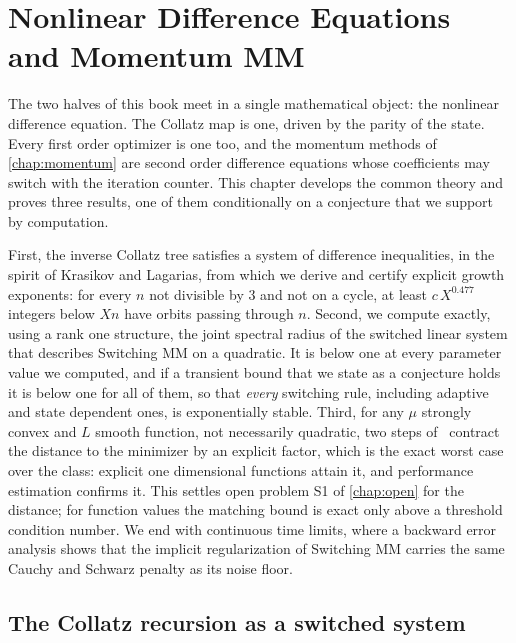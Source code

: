 \chapter{Nonlinear Difference Equations and Momentum MM}\label{chap:difference}

The two halves of this book meet in a single mathematical object: the
nonlinear difference equation. The Collatz map is one, driven by the parity
of the state. Every first order optimizer is one too, and the momentum
methods of \cref{chap:momentum} are second order difference equations whose
coefficients may switch with the iteration counter.
This chapter develops the common theory and proves three results, one of them conditionally on a conjecture that we support by computation.

First, the inverse Collatz tree satisfies a system of difference
inequalities, in the spirit of Krasikov and Lagarias, from which we derive
and certify explicit growth exponents: for every $n$ not divisible by $3$ and
not on a cycle, at least $c\,X^{0.477}$ integers below $Xn$ have orbits passing
through $n$.
Second, we compute exactly, using a rank one structure, the joint spectral radius of the switched linear system that describes Switching MM on a quadratic. It is below one at every parameter value we computed, and if a transient bound that we state as a conjecture holds it is below one for all of them, so that \emph{every} switching rule, including adaptive and state dependent ones, is exponentially stable.
Third, for any $\mu$ strongly convex and $L$ smooth function, not necessarily quadratic, two steps of \smmdet\ contract the distance to the minimizer by an explicit factor, which is the exact worst case over the class: explicit one dimensional functions attain it, and performance estimation confirms it.
This settles open problem S1 of \cref{chap:open} for the distance; for function values the matching bound is exact only above a threshold condition number.
We end with continuous time limits, where a backward error
analysis shows that the implicit regularization of Switching MM carries the
same Cauchy and Schwarz penalty as its noise floor.

\section{The Collatz recursion as a switched system}\label{sec:ch5b:switched}

